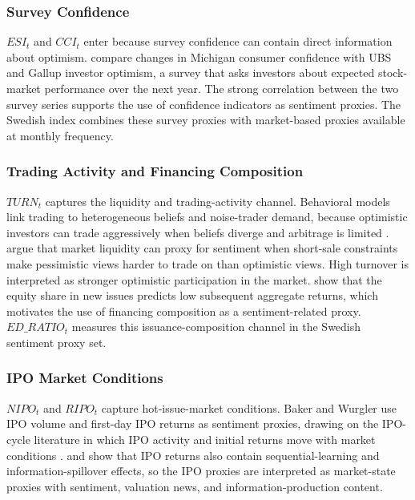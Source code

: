 \documentclass[11pt]{article}
\newcommand{\var}[1]{\ensuremath{#1}}
\begin{document}
\subsubsection{Survey Confidence}
\var{ESI_t} and \var{CCI_t} enter because survey confidence can contain direct information about optimism. \citet{qiu2006sentimentmeasures} compare changes in Michigan consumer confidence with UBS and Gallup investor optimism, a survey that asks investors about expected stock-market performance over the next year. The strong correlation between the two survey series supports the use of confidence indicators as sentiment proxies. The Swedish index combines these survey proxies with market-based proxies available at monthly frequency.

\subsubsection{Trading Activity and Financing Composition}
\var{TURN_t} captures the liquidity and trading-activity channel. Behavioral models link trading to heterogeneous beliefs and noise-trader demand, because optimistic investors can trade aggressively when beliefs diverge and arbitrage is limited \citep{delong1990noise,miller1977divergence}. \citet{baker2004stein} argue that market liquidity can proxy for sentiment when short-sale constraints make pessimistic views harder to trade on than optimistic views. High turnover is interpreted as stronger optimistic participation in the market. \citet{baker2000equityshare} show that the equity share in new issues predicts low subsequent aggregate returns, which motivates the use of financing composition as a sentiment-related proxy. \var{ED\_RATIO_t} measures this issuance-composition channel in the Swedish sentiment proxy set.

\subsubsection{IPO Market Conditions}
\var{NIPO_t} and \var{RIPO_t} capture hot-issue-market conditions. Baker and Wurgler use IPO volume and first-day IPO returns as sentiment proxies, drawing on the IPO-cycle literature in which IPO activity and initial returns move with market conditions \citep{ibbotson1975hot,ritter1991ipo,baker2006sentiment}. \citet{lowry2002ipo} and \citet{benveniste2003spillovers} show that IPO returns also contain sequential-learning and information-spillover effects, so the IPO proxies are interpreted as market-state proxies with sentiment, valuation news, and information-production content.
\end{document}
